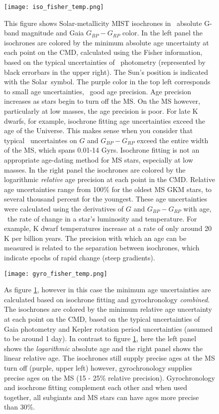 \begin{figure}
  \caption{
    This figure shows Solar-metallicity MIST isochrones in \Gaia\ absolute
    G-band magnitude and Gaia $G_{BP} - G_{RP}$ color.
    In the left panel the isochrones are colored by the minimum absolute age
    uncertainty at each point on the CMD, calculated using the Fisher
    information, based on the typical uncertainties of \Gaia\ photometry
    (represented by black errorbars in the upper right).
    The Sun's position \citep{casagrande2018} is indicated with the Solar\
    symbol.
    The purple color in the top left corresponds to small age uncertainties,
    \ie\ good age precision.
    Age precision increases as stars begin to turn off the MS.
    On the MS however, particularly at low masses, the age precision is poor.
    For late K dwarfs, for example, isochrone fitting age uncertainties exceed
    the age of the Universe.
    This makes sense when you consider that typical \Gaia\ uncertaintes on $G$
    and $G_{BP} - G_{RP}$ exceed the entire width of the MS, which spans
    0.01-14 Gyrs.
    Isochrone fitting is not an appropriate age-dating method for MS stars,
    especially at low masses.
    In the right panel the isochrones are colored by the logarithmic
    {\it relative} age precision at each point in the CMD.
    Relative age uncertainties range from 100\% for the oldest MS GKM stars,
    to several thousand percent for the youngest.
    These age uncertainties were calculated using the derivatives of $G$ and
    $G_{BP} - G_{RP}$ with age, \ie\ the rate of change in a star's luminosity
    and temperature.
    For example, K dwarf temperatures increase at a rate of only around 20 K
    per billion years.
    The precision with which an age can be measured is related to the
    separation between isochrones, which indicate epochs of rapid change
    (steep gradients).\label{fig:fischer_iso}
}
  \centering
    \texttt{[image: iso\_fisher\_temp.png]}
\label{fig:iso_fisher}
\end{figure}

\begin{figure}
  \caption{
    As figure \ref{fig:iso_fisher}, however in this case the minimum age
    uncertainties are calculated based on isochrone fitting and gyrochronology
    {\it combined}.
    The isochrones are colored by the minimum relative age uncertainty at each
    point on the CMD, based on the typical uncertainties of Gaia photometry
    and Kepler rotation period uncertainties (assumed to be around 1 day).
    In contrast to figure \ref{fig:iso_fisher}, here the left panel shows the
    {\it logarithmic} absolute age and the right panel shows the linear
    relative age.
    The isochrones still supply precise ages at the MS turn off (purple, upper
    left) however, gyrochronology supplies precise ages on the MS (15 - 25\%
    relative precision).
    Gyrochronology and isochrone fitting complement each other and when used
    together, all subgiants and MS stars can have ages more precise than 30\%.
    \label{fig:fischer_gyro}
}
  \centering
    \texttt{[image: gyro\_fisher\_temp.png]}
\label{fig:gyro_fisher}
\end{figure}
